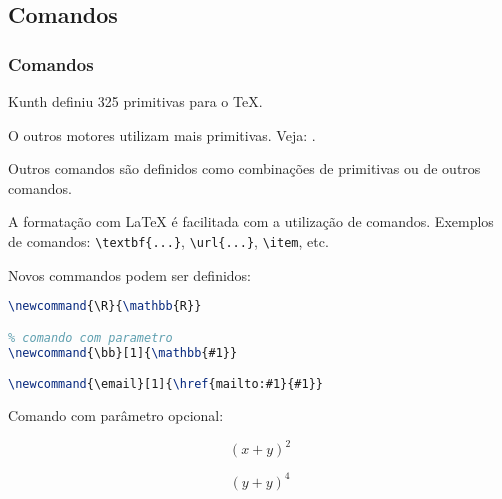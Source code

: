 \subsection{Comandos}

\begin{frame}
\frametitle{Comandos}
Kunth definiu 325 primitivas para o \TeX{}.

\vspace{3ex}
O outros motores utilizam mais primitivas.
Veja: .


\vspace{3ex}
Outros comandos são definidos como combinações de primitivas ou de outros comandos.

\framebreak 

A formatação com \LaTeX{} é facilitada com a utilização de comandos.
Exemplos de comandos: \verb|\textbf{...}|, \verb|\url{...}|, \verb|\item|, etc.

\vspace{3ex}
Novos commandos podem ser definidos:
\begin{lstlisting}[language=tex, label=lst-comand-def, postbreak=\mbox{$\hookrightarrow$\space}, basicstyle=\fontsize{8}{10}\selectfont\ttfamily]
% comando simples
\newcommand{\R}{\mathbb{R}}

% comando com parametro
\newcommand{\bb}[1]{\mathbb{#1}} 

\newcommand{\email}[1]{\href{mailto:#1}{#1}}
\end{lstlisting}

\framebreak

Comando com parâmetro opcional:
\begin{LTXexample}
\newcommand{\plusbinomial}[3][2]{(#2 + #3)^#1}

\[ \plusbinomial{x}{y} \]

\[ \plusbinomial[4]{y}{y} \]
\end{LTXexample}
\end{frame}



